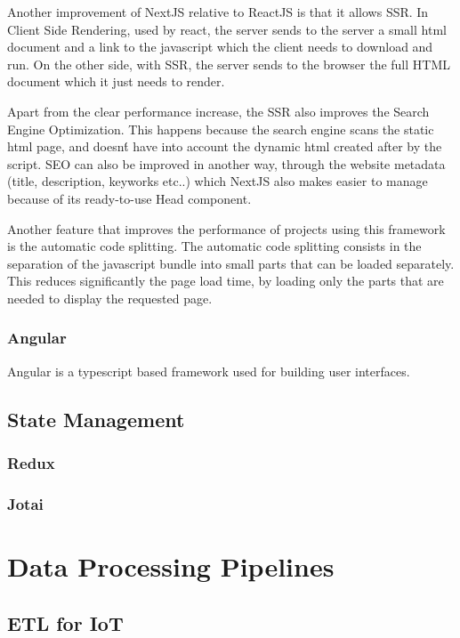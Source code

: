 Another improvement of NextJS relative to ReactJS is that it allows SSR. In
Client Side Rendering, used by react, the server sends to the server a small
html document and a link to the javascript which the client needs to download
and run. On the other side, with SSR, the server sends to the browser the
full HTML document which it just needs to render\cite{Salanke_A.R_G.S_Dalali_2022}.

Apart from the clear performance increase, the SSR also improves the Search
Engine Optimization. This happens because the search engine scans the static
html page, and doesn\'t have into account the dynamic html created after by
the script. SEO can also be improved in another way, through the website
metadata (title, description, keyworks etc..) which NextJS also makes easier to
manage because of its ready-to-use Head component.

Another feature that improves the performance of projects using this framework
is the automatic code splitting. The automatic code splitting consists in
the separation of the javascript bundle into small parts that can be loaded
separately. This reduces significantly the page load time, by loading only the
parts that are needed to display the requested page.

\subsubsection{Angular}
Angular is a typescript based framework used for building user interfaces.


\subsection{State Management}

\subsubsection{Redux}
\subsubsection{Jotai}

\section{Data Processing Pipelines}
\subsection{ETL for IoT}
